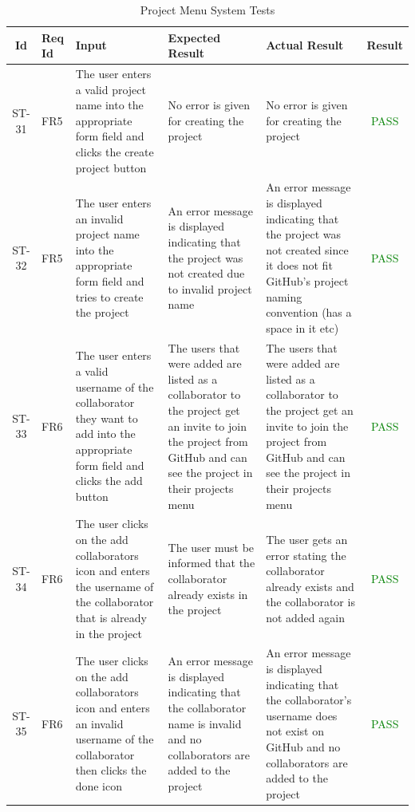 \documentclass[12pt, titlepage]{article}
\begin{document}
	\begin{center}
		\begin{longtable}{|c|p{1cm}|p{2.7cm}|p{3cm}|p{3cm}|c|}
			\caption{Project Menu System Tests \label{long}}\\
			\hline
			\textbf{Id} & \textbf{Req Id} & \textbf{Input} & \textbf{Expected Result} & \textbf{Actual Result} & \textbf{Result}   \\
			\hline
			ST-31 & FR5 & The user enters a valid project name into the appropriate form field and clicks the create project button & No error is given for creating the project & No error is given for creating the project &  \textcolor{green}{PASS} \\
			\hline
			ST-32 & FR5 & The user enters an invalid project name into the appropriate form field and tries to create the project & An error message is displayed indicating that the project was not created due to invalid project name & An error message is displayed indicating that the project was not created since it does not fit GitHub's project naming convention (has a space in it etc) &  \textcolor{green}{PASS} \\
			\hline
			ST-33 & FR6 & The user enters a valid username of the collaborator they want to add into the appropriate form field and clicks the add button & The users that were added are listed as a collaborator to the project get an invite to join the project from GitHub and can see the project in their projects menu & The users that were added are listed as a collaborator to the project get an invite to join the project from GitHub and can see the project in their projects menu & \textcolor{green}{PASS} \\
			\hline
			ST-34 & FR6 &  The user clicks on the add collaborators icon and enters the username of the collaborator that is already in the project & The user must be informed that the collaborator already exists in the project & The user gets an error stating the collaborator already exists and the collaborator is not added again & \textcolor{green}{PASS} \\
			\hline
			ST-35 & FR6 & The user clicks on the add collaborators icon and enters an invalid username of the collaborator then clicks the done icon  & An error message is displayed indicating that the collaborator name is invalid and no collaborators are added to the project & An error message is displayed indicating that the collaborator's username does not exist on GitHub and no collaborators are added to the project & \textcolor{green}{PASS}\\

\end{longtable}
\end{center}
\end{document}
